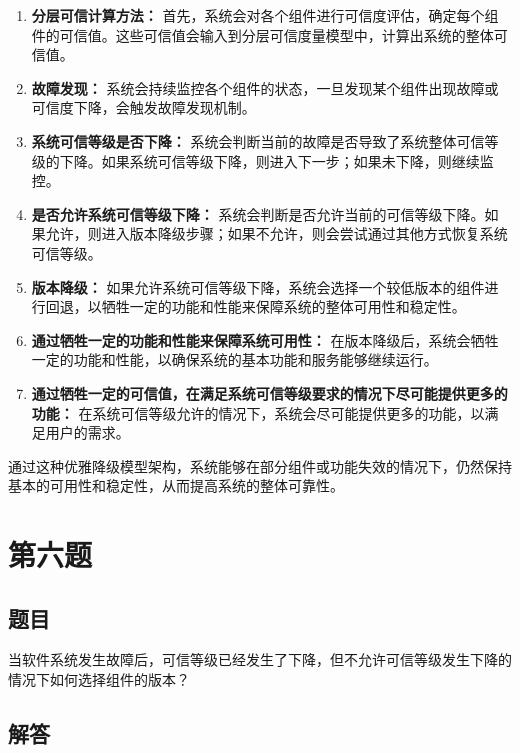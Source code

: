 \documentclass{article}
\begin{document}
\begin{enumerate}
	\item \textbf{分层可信计算方法：} 首先，系统会对各个组件进行可信度评估，确定每个组件的可信值。这些可信值会输入到分层可信度量模型中，计算出系统的整体可信值。
	
	\item \textbf{故障发现：} 系统会持续监控各个组件的状态，一旦发现某个组件出现故障或可信度下降，会触发故障发现机制。
	
	\item \textbf{系统可信等级是否下降：} 系统会判断当前的故障是否导致了系统整体可信等级的下降。如果系统可信等级下降，则进入下一步；如果未下降，则继续监控。
	
	\item \textbf{是否允许系统可信等级下降：} 系统会判断是否允许当前的可信等级下降。如果允许，则进入版本降级步骤；如果不允许，则会尝试通过其他方式恢复系统可信等级。
	
	\item \textbf{版本降级：} 如果允许系统可信等级下降，系统会选择一个较低版本的组件进行回退，以牺牲一定的功能和性能来保障系统的整体可用性和稳定性。
	
	\item \textbf{通过牺牲一定的功能和性能来保障系统可用性：} 在版本降级后，系统会牺牲一定的功能和性能，以确保系统的基本功能和服务能够继续运行。
	
	\item \textbf{通过牺牲一定的可信值，在满足系统可信等级要求的情况下尽可能提供更多的功能：} 在系统可信等级允许的情况下，系统会尽可能提供更多的功能，以满足用户的需求。
\end{enumerate}

通过这种优雅降级模型架构，系统能够在部分组件或功能失效的情况下，仍然保持基本的可用性和稳定性，从而提高系统的整体可靠性。

\section{第六题}

\subsection{题目}

当软件系统发生故障后，可信等级已经发生了下降，但不允许可信等级发生下降的情况下如何选择组件的版本？

\subsection{解答}
\end{document}
